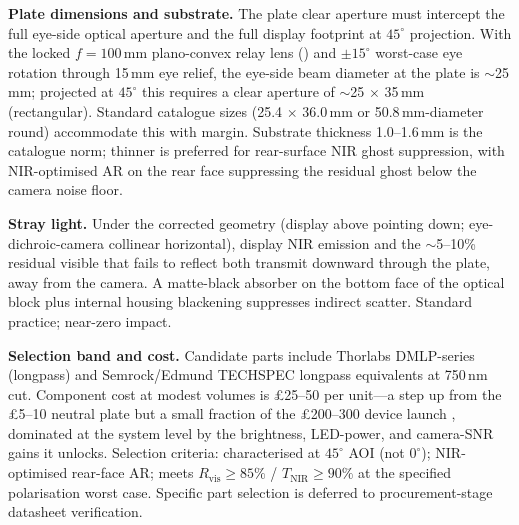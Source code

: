 \textbf{Plate dimensions and substrate.} The plate clear aperture must intercept the full eye-side optical aperture and the full display footprint at $45^{\circ}$ projection. With the locked $f = 100$\,mm plano-convex relay lens () and $\pm 15^{\circ}$ worst-case eye rotation through 15\,mm eye relief, the eye-side beam diameter at the plate is $\sim$25\,mm; projected at $45^{\circ}$ this requires a clear aperture of $\sim$25 $\times$ 35\,mm (rectangular). Standard catalogue sizes (25.4 $\times$ 36.0\,mm or 50.8\,mm-diameter round) accommodate this with margin. Substrate thickness 1.0--1.6\,mm is the catalogue norm; thinner is preferred for rear-surface NIR ghost suppression, with NIR-optimised AR on the rear face suppressing the residual ghost below the camera noise floor.

\textbf{Stray light.} Under the corrected geometry (display above pointing down; eye-dichroic-camera collinear horizontal), display NIR emission and the $\sim$5--10\% residual visible that fails to reflect both transmit downward through the plate, away from the camera. A matte-black absorber on the bottom face of the optical block plus internal housing blackening suppresses indirect scatter. Standard practice; near-zero  impact.

\textbf{Selection band and cost.} Candidate parts include Thorlabs DMLP-series (longpass) and Semrock/Edmund TECHSPEC longpass equivalents at 750\,nm cut. Component cost at modest volumes is \pounds 25--50 per unit---a step up from the \pounds 5--10 neutral plate but a small fraction of the \pounds 200--300 device launch , dominated at the system level by the brightness, LED-power, and camera-SNR gains it unlocks. Selection criteria: characterised at $45^{\circ}$ AOI (not $0^{\circ}$); NIR-optimised rear-face AR; meets $R_{\text{vis}} \geq 85\%$ / $T_{\text{NIR}} \geq 90\%$ at the specified polarisation worst case. Specific part selection is deferred to procurement-stage datasheet verification.



